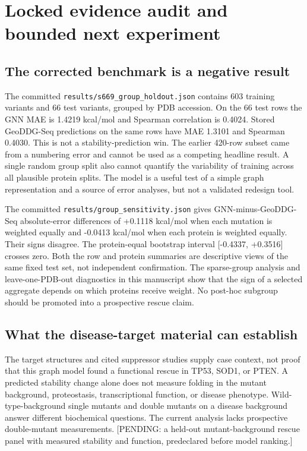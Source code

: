 \clearpage
\section{Locked evidence audit and bounded next experiment}
\subsection{The corrected benchmark is a negative result}
The committed \texttt{results/s669\_group\_holdout.json} contains 603 training variants and 66 test variants, grouped by PDB accession. On the 66 test rows the GNN MAE is 1.4219 kcal/mol and Spearman correlation is 0.4024. Stored GeoDDG-Seq predictions on the same rows have MAE 1.3101 and Spearman 0.4030. This is not a stability-prediction win. The earlier 420-row subset came from a numbering error and cannot be used as a competing headline result. A single random group split also cannot quantify the variability of training across all plausible protein splits. The model is a useful test of a simple graph representation and a source of error analyses, but not a validated redesign tool.

The committed \texttt{results/group\_sensitivity.json} gives GNN-minus-GeoDDG-Seq absolute-error differences of +0.1118 kcal/mol when each mutation is weighted equally and -0.0413 kcal/mol when each protein is weighted equally. Their signs disagree. The protein-equal bootstrap interval [-0.4337, +0.3516] crosses zero. Both the row and protein summaries are descriptive views of the same fixed test set, not independent confirmation. The sparse-group analysis and leave-one-PDB-out diagnostics in this manuscript show that the sign of a selected aggregate depends on which proteins receive weight. No post-hoc subgroup should be promoted into a prospective rescue claim.

\subsection{What the disease-target material can establish}
The target structures and cited suppressor studies supply case context, not proof that this graph model found a functional rescue in TP53, SOD1, or PTEN. A predicted stability change alone does not measure folding in the mutant background, proteostasis, transcriptional function, or disease phenotype. Wild-type-background single mutants and double mutants on a disease background answer different biochemical questions. The current analysis lacks prospective double-mutant measurements. [PENDING: a held-out mutant-background rescue panel with measured stability and function, predeclared before model ranking.]

